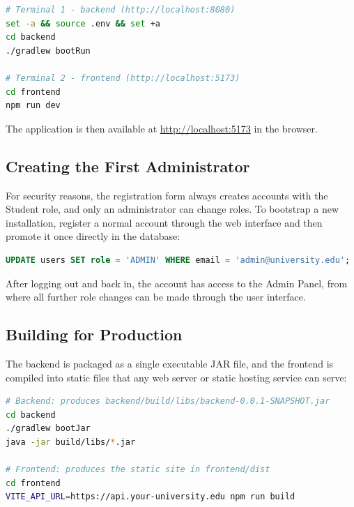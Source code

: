 \begin{lstlisting}[language=bash,caption={Starting the backend and frontend separately},label={lst:start-sep}]
# Terminal 1 - backend (http://localhost:8080)
set -a && source .env && set +a
cd backend
./gradlew bootRun

# Terminal 2 - frontend (http://localhost:5173)
cd frontend
npm run dev
\end{lstlisting}

The application is then available at \url{http://localhost:5173} in the browser.

\subsection{Creating the First Administrator}

For security reasons, the registration form always creates accounts with the Student
role, and only an administrator can change roles. To bootstrap a new installation,
register a normal account through the web interface and then promote it once directly
in the database:

\begin{lstlisting}[language=SQL,caption={Promoting the first administrator},label={lst:first-admin}]
UPDATE users SET role = 'ADMIN' WHERE email = 'admin@university.edu';
\end{lstlisting}

After logging out and back in, the account has access to the Admin Panel, from where
all further role changes can be made through the user interface.

\subsection{Building for Production}

The backend is packaged as a single executable JAR file, and the frontend is compiled
into static files that any web server or static hosting service can serve:

\begin{lstlisting}[language=bash,caption={Building and running for production},label={lst:prod}]
# Backend: produces backend/build/libs/backend-0.0.1-SNAPSHOT.jar
cd backend
./gradlew bootJar
java -jar build/libs/*.jar

# Frontend: produces the static site in frontend/dist
cd frontend
VITE_API_URL=https://api.your-university.edu npm run build
\end{lstlisting}

